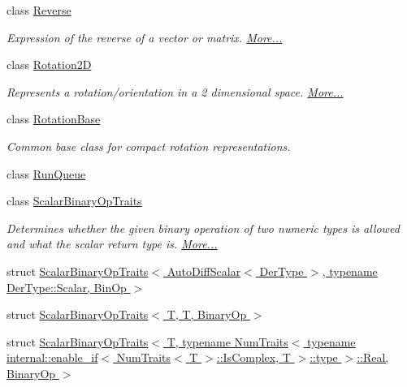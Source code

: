 \begin{DoxyCompactItemize}
\item 
class \hyperlink{group___core___module_class_eigen_1_1_reverse}{Reverse}
\begin{DoxyCompactList}\small\item\em Expression of the reverse of a vector or matrix.  \hyperlink{group___core___module_class_eigen_1_1_reverse}{More...}\end{DoxyCompactList}\item 
class \hyperlink{group___geometry___module_class_eigen_1_1_rotation2_d}{Rotation2D}
\begin{DoxyCompactList}\small\item\em Represents a rotation/orientation in a 2 dimensional space.  \hyperlink{group___geometry___module_class_eigen_1_1_rotation2_d}{More...}\end{DoxyCompactList}\item 
class \hyperlink{class_eigen_1_1_rotation_base}{Rotation\+Base}
\begin{DoxyCompactList}\small\item\em Common base class for compact rotation representations. \end{DoxyCompactList}\item 
class \hyperlink{class_eigen_1_1_run_queue}{Run\+Queue}
\item 
class \hyperlink{group___core___module_struct_eigen_1_1_scalar_binary_op_traits}{Scalar\+Binary\+Op\+Traits}
\begin{DoxyCompactList}\small\item\em Determines whether the given binary operation of two numeric types is allowed and what the scalar return type is.  \hyperlink{group___core___module_struct_eigen_1_1_scalar_binary_op_traits}{More...}\end{DoxyCompactList}\item 
struct \hyperlink{struct_eigen_1_1_scalar_binary_op_traits_3_01_auto_diff_scalar_3_01_der_type_01_4_00_01typename_8029eb4becd448e88ba5e4cb75a4dd2b}{Scalar\+Binary\+Op\+Traits$<$ Auto\+Diff\+Scalar$<$ Der\+Type $>$, typename Der\+Type\+::\+Scalar, Bin\+Op $>$}
\item 
struct \hyperlink{struct_eigen_1_1_scalar_binary_op_traits_3_01_t_00_01_t_00_01_binary_op_01_4}{Scalar\+Binary\+Op\+Traits$<$ T, T, Binary\+Op $>$}
\item 
struct \hyperlink{struct_eigen_1_1_scalar_binary_op_traits_3_01_t_00_01typename_01_num_traits_3_01typename_01inter6d9b2ba43c8f599c26e1e5ea9727da7f}{Scalar\+Binary\+Op\+Traits$<$ T, typename Num\+Traits$<$ typename internal\+::enable\+\_\+if$<$ Num\+Traits$<$ T $>$\+::\+Is\+Complex, T $>$\+::type $>$\+::\+Real, Binary\+Op $>$}

\end{DoxyCompactItemize}
